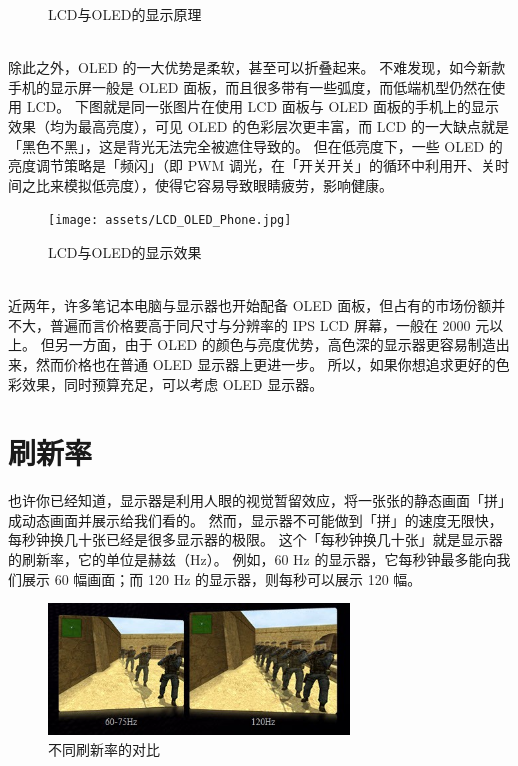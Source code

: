 \begin{itemize}
\begin{figure}[htb!]
      \caption{LCD与OLED的显示原理}
      \label{LCD_OLED}
    \end{figure}\\
    除此之外，OLED 的一大优势是柔软，甚至可以折叠起来。
    不难发现，如今新款手机的显示屏一般是 OLED 面板，而且很多带有一些弧度，而低端机型仍然在使用 LCD。
    下图就是同一张图片在使用 LCD 面板与 OLED 面板的手机上的显示效果（均为最高亮度），可见 OLED 的色彩层次更丰富，而 LCD 的一大缺点就是「黑色不黑」，这是背光无法完全被遮住导致的。
    但在低亮度下，一些 OLED 的亮度调节策略是「频闪」（即 PWM 调光，在「开关开关」的循环中利用开、关时间之比来模拟低亮度），使得它容易导致眼睛疲劳，影响健康。
    \begin{figure}[htb!]
      \centering
      \texttt{[image: assets/LCD\_OLED\_Phone.jpg]}
      \caption{LCD与OLED的显示效果}
      \label{LCD_OLED_Phone}
    \end{figure}\\
    近两年，许多笔记本电脑与显示器也开始配备 OLED 面板，但占有的市场份额并不大，普遍而言价格要高于同尺寸与分辨率的 IPS LCD 屏幕，一般在 2000 元以上。
    但另一方面，由于 OLED 的颜色与亮度优势，高色深的显示器更容易制造出来，然而价格也在普通 OLED 显示器上更进一步。
    所以，如果你想追求更好的色彩效果，同时预算充足，可以考虑 OLED 显示器。
\end{itemize}

\section{刷新率}

也许你已经知道，显示器是利用人眼的视觉暂留效应，将一张张的静态画面「拼」成动态画面并展示给我们看的。
然而，显示器不可能做到「拼」的速度无限快，每秒钟换几十张已经是很多显示器的极限。
这个「每秒钟换几十张」就是显示器的刷新率，它的单位是赫兹（Hz）。
例如，60 Hz 的显示器，它每秒钟最多能向我们展示 60 幅画面；而 120 Hz 的显示器，则每秒可以展示 120 幅。

\begin{figure}[htb!]
  \centering
  \includegraphics[width=8cm]{assets/60Hz_vs_120Hz.jpg}
  \caption{不同刷新率的对比}
  \label{60Hz_vs_120Hz}
\end{figure}

